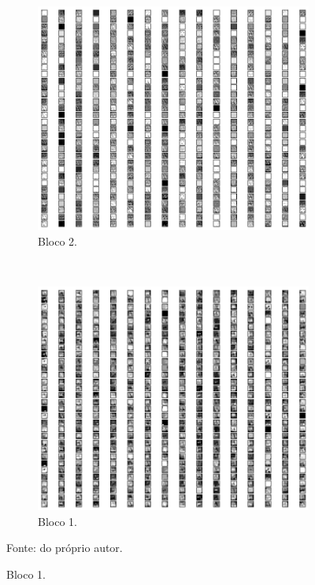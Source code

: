 \begin{figure}[H]
     \begin{subfigure}[t]{0.45\textwidth}
         \centering
         \includegraphics[width=1\linewidth]{recursos/imagens/results/bpca4.png}
         \caption{Bloco 2.}
         \label{results:fig:datasets:bpca.4}
     \end{subfigure}%
     ~ 
     \begin{subfigure}[t]{0.45\textwidth}
         \centering
         \includegraphics[width=1\linewidth]{recursos/imagens/results/bpca5.png}
         \caption{Bloco 1.}
         \label{results:fig:datasets:bpca.5}
     \end{subfigure}%
 
     Fonte: do próprio autor.
\end{figure}


